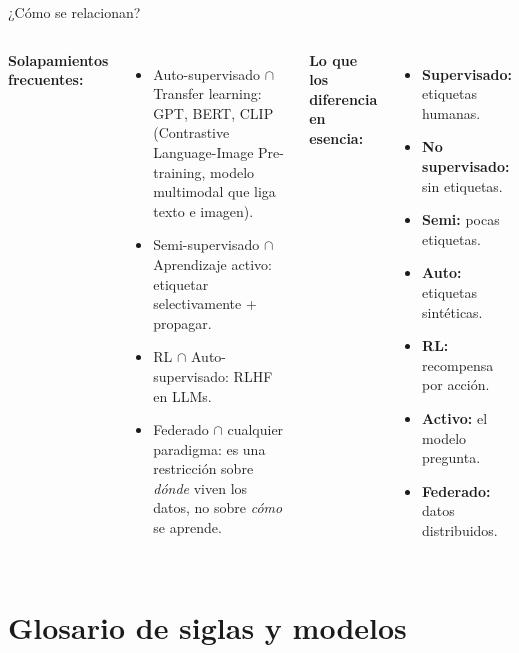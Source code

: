 \documentclass[aspectratio=169]{beamer}
\begin{document}
\begin{frame}{¿Cómo se relacionan?}
  \begin{columns}
      \textbf{Solapamientos frecuentes:}
      \begin{itemize}
        \item Auto-supervisado $\cap$ Transfer learning: GPT, BERT, CLIP (Contrastive Language-Image Pre-training, modelo multimodal que liga texto e imagen).
        \item Semi-supervisado $\cap$ Aprendizaje activo: etiquetar selectivamente + propagar.
        \item RL $\cap$ Auto-supervisado: RLHF en LLMs.
        \item Federado $\cap$ cualquier paradigma: es una restricción sobre \textit{dónde} viven los datos, no sobre \textit{cómo} se aprende.
      \end{itemize}
      \textbf{Lo que los diferencia en esencia:}
      \begin{itemize}
        \item \textbf{Supervisado:} etiquetas humanas.
        \item \textbf{No supervisado:} sin etiquetas.
        \item \textbf{Semi:} pocas etiquetas.
        \item \textbf{Auto:} etiquetas sintéticas.
        \item \textbf{RL:} recompensa por acción.
        \item \textbf{Activo:} el modelo pregunta.
        \item \textbf{Federado:} datos distribuidos.
      \end{itemize}
  \end{columns}
\end{frame}

\section{Glosario de siglas y modelos}
\end{document}

